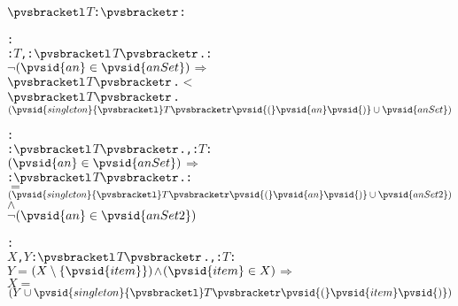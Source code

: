 \def\setsothermembertwofn#1#2{{(#1 \in #2)}}%
\def\opohtwofn#1#2{{#1\circ#2}}%
\def\opdividetwofn#1#2{{\frac{#1}{#2}}}%
\def\optimestwofn#1#2{{#1\times#2}}%
\def\opdifferenceonefn#1{{-#1}}%
\def\opdifferencetwofn#1#2{{#1-#2}}%
\def\opplustwofn#1#2{{#1+#2}}%
\begin{alltt}
\({\pvsbracketl}\)\(T\): \({\pvsbracketr}\): 

   


  : 
     \pvsid{(}: \(T\), : \({\pvsbracketl}\)\(T\)\({\pvsbracketr}\).\pvsid{)}:
      \pvsid{(}\(\neg\) \(\setsothermembertwofn{\pvsid{an}}{\pvsid{anSet}}\)\pvsid{)} \(\Rightarrow\)
       \({\pvsbracketl}\)\(T\)\({\pvsbracketr}\).\pvsid{(}\pvsid{)} \(<\)
        \({\pvsbracketl}\)\(T\)\({\pvsbracketr}\).\pvsid{(}\(\setsotheruniontwofn{\pvsid{singleton}{\pvsbracketl}T{\pvsbracketr}\pvsid{(}\pvsid{an}\pvsid{)}}{\pvsid{anSet}}\)\pvsid{)}\vspace*{\pvsdeclspacing}

  : 
     \pvsid{(}: \({\pvsbracketl}\)\(T\)\({\pvsbracketr}\)., : \(T\)\pvsid{)}:
      \(\setsothermembertwofn{\pvsid{an}}{\pvsid{anSet}}\) \(\Rightarrow\)
       \pvsid{(} \pvsid{(}: \({\pvsbracketl}\)\(T\)\({\pvsbracketr}\).\pvsid{)}:
            \(=\) \(\setsotheruniontwofn{\pvsid{singleton}{\pvsbracketl}T{\pvsbracketr}\pvsid{(}\pvsid{an}\pvsid{)}}{\pvsid{anSet2}}\) \(\wedge\)
            \pvsid{(}\(\neg\) \(\setsothermembertwofn{\pvsid{an}}{\pvsid{anSet2}}\)\pvsid{)}\pvsid{)}\vspace*{\pvsdeclspacing}

  : 
     \pvsid{(}\(X\), \(Y\): \({\pvsbracketl}\)\(T\)\({\pvsbracketr}\)., : \(T\)\pvsid{)}:
      \(Y\) \(=\) \(\setsotherremovetwofn{\pvsid{item}}{X}\) \(\wedge\) \(\setsothermembertwofn{\pvsid{item}}{X}\) \(\Rightarrow\)
       \(X\) \(=\) \(\setsotheruniontwofn{Y}{\pvsid{singleton}{\pvsbracketl}T{\pvsbracketr}\pvsid{(}\pvsid{item}\pvsid{)}}\)\vspace*{\pvsdeclspacing}


\end{alltt}
